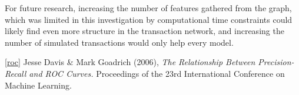 \documentclass{article} %
\begin{document}
For future research, increasing the number of features gathered from the graph, which was limited in this investigation by computational time constraints could likely find even more structure in the transaction network, and increasing the number of simulated transactions would only help every model.  




\ref{roc} Jesse Davis \& Mark Goadrich (2006), \emph{The Relationship Between Precision-Recall and ROC Curves.} Proceedings of the 23rd International Conference on Machine Learning.
\end{document}
